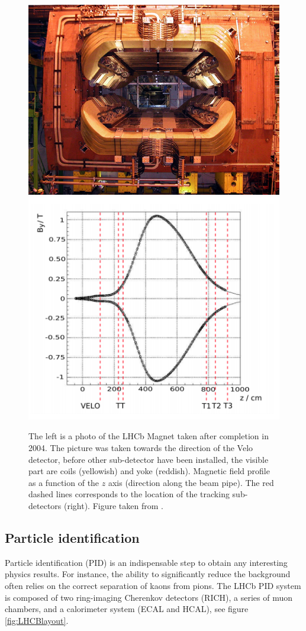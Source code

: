 \begin{figure}[h]
 \begin{center}
  \includegraphics[width=0.49\linewidth]{figures/magnet_photo.jpg}
   \includegraphics[width=0.49\linewidth]{figures/magnet_profile.PNG}
   \caption{The left is a photo of the LHCb Magnet taken after completion in 2004. The picture was taken towards the direction of the Velo detector, before other sub-detector have been installed, the visible part are coils (yellowish) and yoke (reddish). Magnetic field profile as a function of the $z$ axis (direction along the beam pipe). The red dashed lines corresponds to the location of the tracking sub-detectors (right). Figure taken from \cite{lhcb}.   
     \label{fig:magnet}}
 \end{center}
\end{figure}


\subsection{Particle identification}

Particle identification (PID) is an indispensable step to obtain any interesting physics results. For instance, the ability to significantly reduce the background often relies on the correct separation of kaons from pions.
The LHCb PID system is composed of two ring-imaging Cherenkov detectors (RICH), a series of muon chambers, and a calorimeter system (ECAL and HCAL), see figure \ref{fig:LHCBlayout}. 

